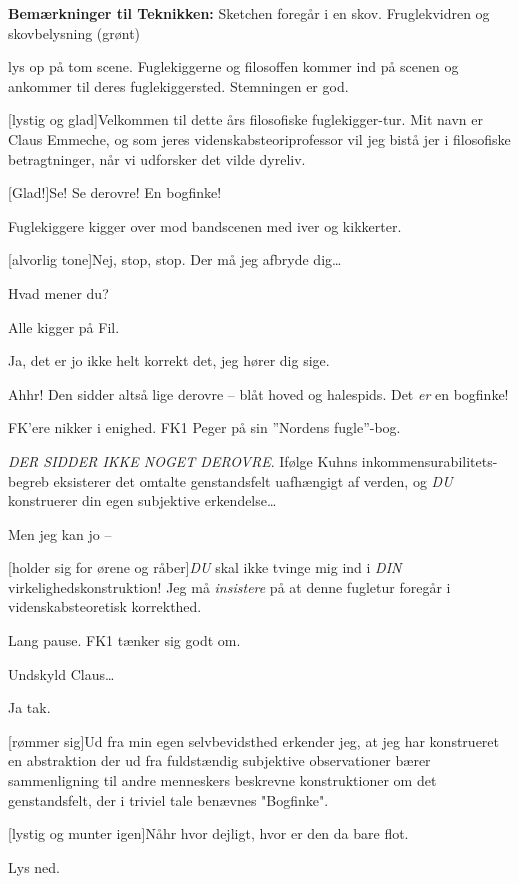 \documentclass[a4paper,12pt]{article}
\begin{document}
\begin{sketch}

\scene \textbf{Bemærkninger til Teknikken:}
Sketchen foregår i en skov. Fruglekvidren og skovbelysning (grønt)


\scene lys op på tom scene. Fuglekiggerne og filosoffen kommer ind på scenen og ankommer til deres fuglekiggersted. Stemningen er god.

[lystig og glad]Velkommen til dette års filosofiske fuglekigger-tur. Mit navn er Claus Emmeche, og som jeres videnskabsteoriprofessor vil jeg bistå jer i filosofiske betragtninger, når vi udforsker det vilde dyreliv.

[Glad!]Se! Se derovre! En bogfinke!

\scene Fuglekiggere kigger over mod bandscenen med iver og kikkerter.

[alvorlig tone]Nej, stop, stop. Der må jeg afbryde dig\ldots

Hvad mener du?

\scene Alle kigger på Fil.

Ja, det er jo ikke helt korrekt det, jeg hører dig sige.

Ahhr! Den sidder altså lige derovre -- blåt hoved og halespids. 
Det \emph{er} en bogfinke!

\scene FK'ere nikker i enighed. FK1 Peger på sin ''Nordens fugle''-bog.

\emph{DER SIDDER IKKE NOGET DEROVRE}. Ifølge Kuhns inkommensurabilitets-begreb eksisterer det omtalte genstandsfelt uafhængigt af verden, og \emph{DU} konstruerer din egen subjektive erkendelse\ldots {}

Men jeg kan jo --

[holder sig for ørene og råber]\emph{DU} skal ikke tvinge mig ind i \emph{DIN} virkelighedskonstruktion!  Jeg må \emph{insistere} på at denne fugletur foregår i videnskabsteoretisk korrekthed.

\scene Lang pause. FK1 tænker sig godt om.

Undskyld Claus\ldots

Ja tak.

[rømmer sig]Ud fra min egen selvbevidsthed erkender jeg, at jeg har konstrueret en abstraktion der ud fra fuldstændig subjektive observationer bærer sammenligning til andre menneskers beskrevne konstruktioner om det genstandsfelt, der i triviel tale benævnes "Bogfinke".

[lystig og munter igen]Nåhr hvor dejligt, hvor er den da bare flot.

Lys ned.

\end{sketch}
\end{document}
